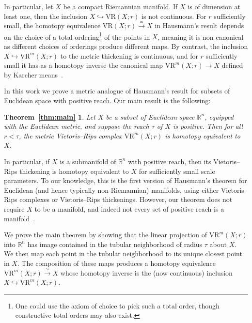 \documentclass{amsart}
\theoremstyle{plain}
\newtheorem*{theorem-main}{Theorem~\ref{thm:main}}
\theoremstyle{definition}
\theoremstyle{myremark}
\newcommand{\R}{\mathbb{R}}
\newcommand{\inj}{\hookrightarrow}     %
\newcommand{\vr}[2]{\mathrm{VR}(#1;#2)}
\newcommand{\vrm}[2]{\mathrm{VR}^m(#1;#2)}
\begin{document}
In particular, let $X$ be a compact Riemannian manifold. If $X$ is of dimension at least one, then the inclusion $X\inj \vr{X}{r}$ is not continuous. For $r$ sufficiently small, the homotopy equivalence $\vr{X}{r}\xrightarrow{\simeq}X$ in Hausmann's result depends on the choice of a total ordering\footnote{One could use the axiom of choice to pick such a total order, though constructive total orders may also exist.} %
of the points in $X$, meaning it is non-canonical as different choices of orderings produce different maps.
By contrast, the inclusion $X \inj \vrm{X}{r}$ to the metric thickening is continuous, and for $r$ sufficiently small it has as a homotopy inverse the canonical map $\vrm{X}{r} \to X$ defined by Karcher means~\cite{MetricReconstructionViaOptimalTransport,Karcher1977}.

In this work we prove a metric analogue of Hausmann's result for subsets of Euclidean space with positive reach. Our main result is the following:

\begin{theorem-main}
Let $X$ be a subset of Euclidean space $\R^n$, equipped with the Euclidean metric, and suppose the reach $\tau$ of $X$ is positive. Then for all $r < \tau$, the metric Vietoris--Rips complex $\vrm{X}{r}$ is homotopy equivalent to $X$.
\end{theorem-main}

In particular, if $X$ is a submanifold of $\R^n$ with positive reach, then its Vietoris--Rips thickening is homotopy equivalent to $X$ for sufficiently small scale parameters.
To our knowledge, this is the first version of Hausmann's theorem for Euclidean (and hence typically non-Riemannian) manifolds, using either Vietoris--Rips complexes or Vietoris--Rips thickenings.
However, our theorem does not require $X$ to be a manifold, and indeed not every set of positive reach is a manifold~\cite{FedererCurvature,rataj2017structure}.

We prove the main theorem by showing that the linear projection of $\vrm{X}{r}$ into $\R^n$ has image contained in the tubular neighborhood of radius $\tau$ about $X$.
We then map each point in the tubular neighborhood to its unique closest point in $X$.
The composition of these maps produces a homotopy equivalence $\vrm{X}{r}\xrightarrow{\simeq} X$ whose homotopy inverse is the (now continuous) inclusion $X\inj \vrm{X}{r}$.
\end{document}

